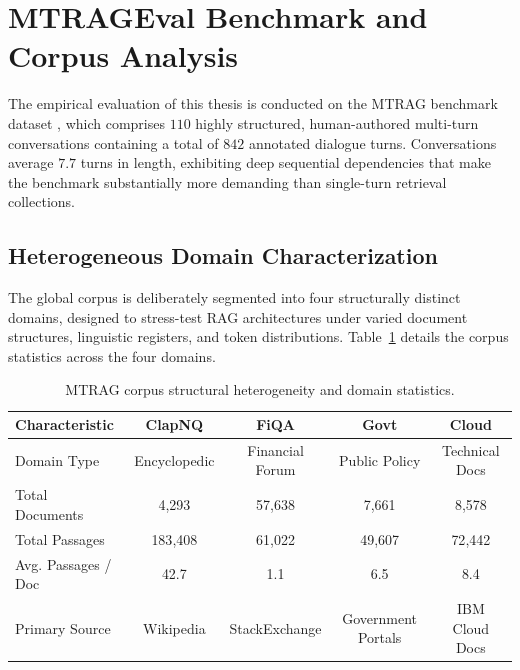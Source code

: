 \section{MTRAGEval Benchmark and Corpus Analysis}
\label{sec:mtrag-corpus}

The empirical evaluation of this thesis is conducted on the MTRAG benchmark dataset \citep{katsis2025mtrag}, which comprises $110$ highly structured, human-authored multi-turn conversations containing a total of $842$ annotated dialogue turns. Conversations average $7.7$ turns in length, exhibiting deep sequential dependencies that make the benchmark substantially more demanding than single-turn retrieval collections.

\subsection{Heterogeneous Domain Characterization}

The global corpus is deliberately segmented into four structurally distinct domains, designed to stress-test RAG architectures under varied document structures, linguistic registers, and token distributions. Table~\ref{tab:corpus-stats-en} details the corpus statistics across the four domains.

\begin{table}[h]
\centering
\small
\begin{tabular}{lcccc}
\toprule
\textbf{Characteristic} & \textbf{ClapNQ} & \textbf{FiQA} & \textbf{Govt} & \textbf{Cloud} \\
\midrule
Domain Type & Encyclopedic & Financial Forum & Public Policy & Technical Docs \\
Total Documents & 4{,}293 & 57{,}638 & 7{,}661 & 8{,}578 \\
Total Passages & 183{,}408 & 61{,}022 & 49{,}607 & 72{,}442 \\
Avg. Passages / Doc & 42.7 & 1.1 & 6.5 & 8.4 \\
Primary Source & Wikipedia & StackExchange & Government Portals & IBM Cloud Docs \\
\bottomrule
\end{tabular}
\caption{MTRAG corpus structural heterogeneity and domain statistics.}
\label{tab:corpus-stats-en}
\end{table}


